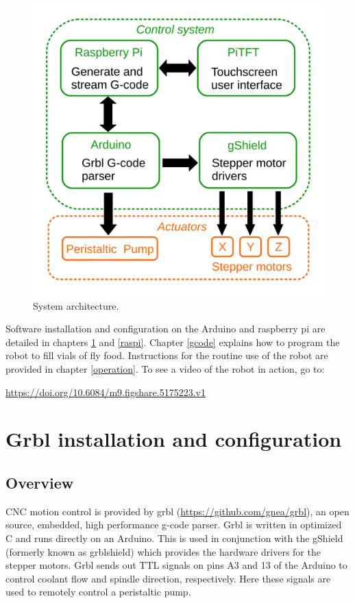 \documentclass[]{book}
\theoremstyle{definition}
\theoremstyle{definition}
\theoremstyle{remark}
\begin{document}
\begin{figure}

{\centering \includegraphics[width=0.75\linewidth]{images/system_architecture} 

}

\caption{System architecture.}\label{fig:architecture}
\end{figure}

Software installation and configuration on the Arduino and raspberry pi
are detailed in chapters \ref{grbl} and \ref{raspi}. Chapter \ref{gcode}
explains how to program the robot to fill vials of fly food.
Instructions for the routine use of the robot are provided in chapter
\ref{operation}. To see a video of the robot in action, go to:

\url{https://doi.org/10.6084/m9.figshare.5175223.v1}

\chapter{Grbl installation and configuration}\label{grbl}

\section{Overview}\label{overview}

CNC motion control is provided by grbl
(\url{https://github.com/gnea/grbl}), an open source, embedded, high
performance g-code parser. Grbl is written in optimized C and runs
directly on an Arduino. This is used in conjunction with the gShield
(formerly known as grblshield) which provides the hardware drivers for
the stepper motors. Grbl sends out TTL signals on pins A3 and 13 of the
Arduino to control coolant flow and spindle direction, respectively.
Here these signals are used to remotely control a peristaltic pump.
\end{document}
